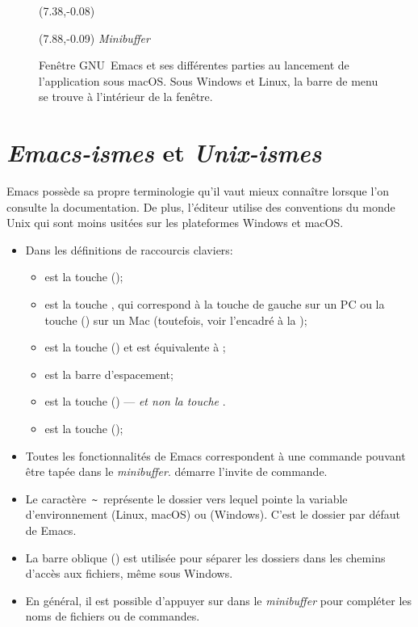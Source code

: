 \begin{figure}[t]
  \begin{textblock}{0.35}(7.38,-0.08)
    \Large\faLongArrowRight
  \end{textblock}
  \begin{textblock}{1.75}(7.88,-0.09)
    \footnotesize\sffamily \emph{Minibuffer}
  \end{textblock}
  \caption{Fenêtre GNU~Emacs et ses différentes parties au lancement
    de l'application sous macOS. Sous Windows et Linux, la barre de
    menu se trouve à l'intérieur de la fenêtre.}
  \label{fig:ess:emacswindow}
\end{figure}


\section{\emph{Emacs-ismes} et \emph{Unix-ismes}}
\label{emacs+ess:ismes}

Emacs possède sa propre terminologie qu'il vaut mieux connaître
lorsque l'on consulte la documentation. De plus, l'éditeur utilise des
conventions du monde Unix qui sont moins usitées sur les plateformes
Windows et macOS.

\begin{itemize}
\item Dans les définitions de raccourcis claviers:
  \begin{itemize}
  \item {} est la touche  (\ctlkey);
  \item {} est la touche , qui correspond à la touche
     de gauche sur un PC ou la touche 
    (\optkey) sur un Mac (toutefois, voir l'encadré à la
    );
  \item {} est la touche  (\esckey) et
    est équivalente à ;
  \item {} est la barre d'espacement;
  \item {} est la touche  (\delkey) ---
    \emph{et non la touche} .
  \item {} est la touche  (\returnkey);
  \end{itemize}
\item Toutes les fonctionnalités de Emacs correspondent à une commande
  pouvant être tapée dans le \emph{minibuffer}.  démarre
  l'invite de commande.
\item Le caractère \,\verb=~=\, représente le dossier vers lequel
  pointe la variable d'environnement  (Linux, macOS) ou
   (Windows). C'est le dossier par défaut de Emacs.
\item La barre oblique (\code{/}) est utilisée pour séparer les
  dossiers dans les chemins d'accès aux fichiers, même sous Windows.
\item En général, il est possible d'appuyer sur  dans le
  \emph{minibuffer} pour compléter les noms de fichiers ou de
  commandes.
\end{itemize}

